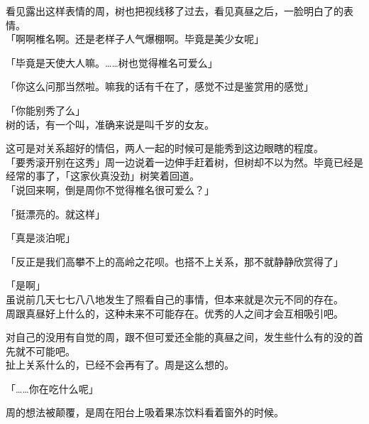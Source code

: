 看见露出这样表情的周，树也把视线移了过去，看见真昼之后，一脸明白了的表情。\\

「啊啊椎名啊。还是老样子人气爆棚啊。毕竟是美少女呢」

「毕竟是天使大人嘛。……树也觉得椎名可爱么」

「你这么问那当然啦。嘛我的话有千在了，感觉不过是鉴赏用的感觉」

「你能别秀了么」\\

树的话，有一个叫，准确来说是叫千岁的女友。

这可是对关系超好的情侣，两人一起的时候可是能秀到这边眼瞎的程度。\\

「要秀滚开别在这秀」周一边说着一边伸手赶着树，但树却不以为然。毕竟已经是经常的事了，「这家伙真没劲」树笑着回道。\\

「说回来啊，倒是周你不觉得椎名很可爱么？」

「挺漂亮的。就这样」

「真是淡泊呢」

「反正是我们高攀不上的高岭之花呗。也搭不上关系，那不就静静欣赏得了」

「是啊」\\

虽说前几天七七八八地发生了照看自己的事情，但本来就是次元不同的存在。\\

周跟真昼好上什么的，这种未来不可能存在。优秀的人之间才会互相吸引吧。

对自己的没用有自觉的周，跟不但可爱还全能的真昼之间，发生些什么有的没的首先就不可能吧。\\

扯上关系什么的，已经不会再有了。周是这么想的。\\

\vspace{2\baselineskip}

「……你在吃什么呢」

周的想法被颠覆，是周在阳台上吸着果冻饮料看着窗外的时候。
